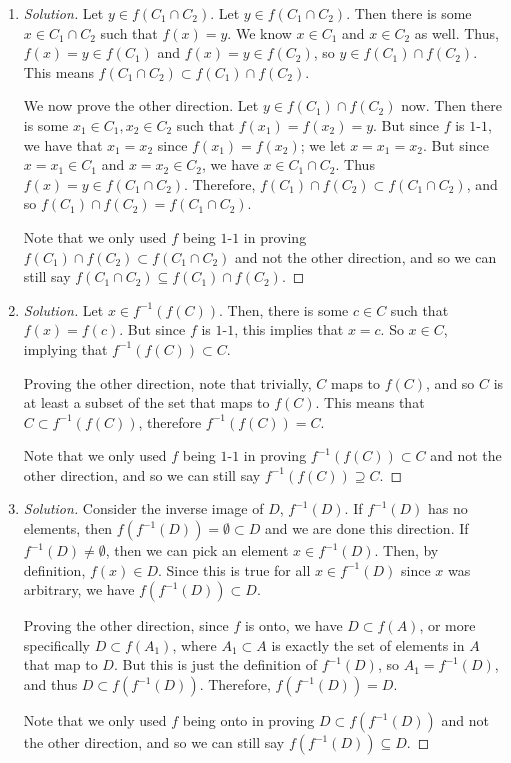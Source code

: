 \documentclass{article}
\begin{document}
\begin{enumerate}
\item \begin{proof}[Solution]\let\qed\relax
Let $y \in f(C_1 \cap C_2)$.
Let $y \in f(C_1 \cap C_2)$.
Then there is some $x \in C_1 \cap C_2$ such that $f(x) = y$.
We know $x \in C_1$ and $x \in C_2$ as well.
Thus, $f(x) = y \in f(C_1)$ and $f(x) = y \in f(C_2)$,
so $y \in f(C_1) \cap f(C_2)$.
This means $f(C_1 \cap C_2) \subset f(C_1) \cap f(C_2)$.

We now prove the other direction.
Let $y \in f(C_1) \cap f(C_2)$ now.
Then there is some $x_1\in C_1,x_2\in C_2$
such that $f(x_1) = f(x_2) = y$.
But since $f$ is $1$-$1$, we have that $x_1 = x_2$ since $f(x_1) = f(x_2)$; we let $x = x_1 = x_2$.
But since $x = x_1 \in C_1$ and $x = x_2 \in C_2$, we have $x \in C_1 \cap C_2$.
Thus $f(x) = y \in f(C_1 \cap C_2)$.
Therefore, $f(C_1) \cap f(C_2) \subset f(C_1 \cap C_2)$,
and so $f(C_1) \cap f(C_2) = f(C_1 \cap C_2)$.

Note that we only used $f$ being $1$-$1$ in proving $f(C_1) \cap f(C_2) \subset f(C_1 \cap C_2)$ and not the other direction,
and so we can still say $f(C_1 \cap C_2) \subseteq f(C_1)\cap f(C_2)$.
\end{proof}
\item \begin{proof}[Solution]\let\qed\relax
Let $x \in f^{-1}(f(C))$.
Then, there is some $c \in C$ such that $f(x) = f(c)$.
But since $f$ is $1$-$1$, this implies that $x = c$.
So $x \in C$, implying that $f^{-1}(f(C)) \subset C$.

Proving the other direction, note that trivially,
$C$ maps to $f(C)$, and so $C$ is at least a subset of the set that maps to $f(C)$.
This means that $C \subset f^{-1}(f(C))$,
therefore $f^{-1}(f(C)) = C$.

Note that we only used $f$ being $1$-$1$ in proving $f^{-1}(f(C)) \subset C$ and not the other direction,
and so we can still say $f^{-1}(f(C)) \supseteq C$.
\end{proof}
\item \begin{proof}[Solution]\let\qed\relax
Consider the inverse image of $D$, $f^{-1}(D)$.
If $f^{-1}(D)$ has no elements,
then $f(f^{-1}(D)) = \emptyset \subset D$ and we are done this direction.
If $f^{-1}(D) \neq \emptyset$, then we can pick an element $x \in f^{-1}(D)$.
Then, by definition, $f(x) \in D$.
Since this is true for all $x \in f^{-1}(D)$ since $x$ was arbitrary,
we have $f(f^{-1}(D)) \subset D$. 

Proving the other direction,
since $f$ is onto, we have $D \subset f(A)$,
or more specifically $D \subset f(A_1)$,
where $A_1 \subset A$
is exactly the set of elements in $A$ that map to $D$.
But this is just the definition of $f^{-1}(D)$, so $A_1 = f^{-1}(D)$,
and thus $D \subset f(f^{-1}(D))$.
Therefore, $f(f^{-1}(D)) = D$.

Note that we only used $f$ being onto in proving $D \subset f(f^{-1}(D))$
and not the other direction,
and so we can still say $f(f^{-1}(D)) \subseteq D$.
\end{proof}
\end{enumerate}
\clearpage
\end{document}
